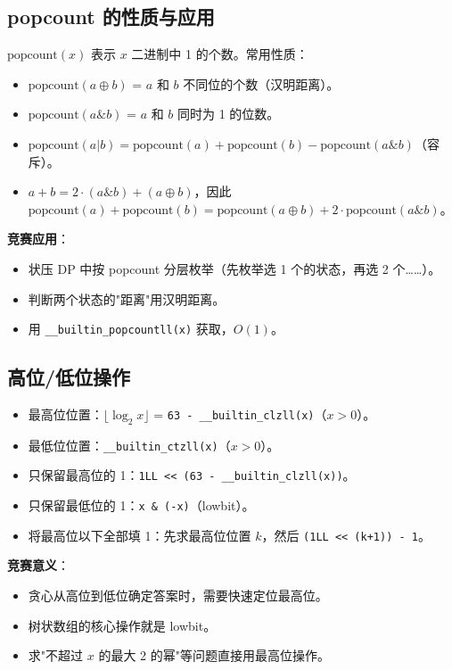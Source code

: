 \documentclass[UTF8,openany,oneside,zihao=-4]{ctexbook}
\begin{document}
\subsection{popcount 的性质与应用}

\begin{note}
$\text{popcount}(x)$ 表示 $x$ 二进制中 1 的个数。常用性质：
\begin{itemize}
  \item $\text{popcount}(a \oplus b)$ = $a$ 和 $b$ 不同位的个数（汉明距离）。
  \item $\text{popcount}(a \& b)$ = $a$ 和 $b$ 同时为 1 的位数。
  \item $\text{popcount}(a | b) = \text{popcount}(a) + \text{popcount}(b) - \text{popcount}(a \& b)$（容斥）。
  \item $a + b = 2 \cdot (a \& b) + (a \oplus b)$，因此 $\text{popcount}(a) + \text{popcount}(b) = \text{popcount}(a \oplus b) + 2 \cdot \text{popcount}(a \& b)$。
\end{itemize}

\textbf{竞赛应用}：
\begin{itemize}
  \item 状压 DP 中按 popcount 分层枚举（先枚举选 1 个的状态，再选 2 个……）。
  \item 判断两个状态的"距离"用汉明距离。
  \item 用 \lstinline|__builtin_popcountll(x)| 获取，$O(1)$。
\end{itemize}
\end{note}

\subsection{高位/低位操作}

\begin{note}
\begin{itemize}
  \item 最高位位置：$\lfloor \log_2 x \rfloor$ = \lstinline|63 - __builtin_clzll(x)|（$x > 0$）。
  \item 最低位位置：\lstinline|__builtin_ctzll(x)|（$x > 0$）。
  \item 只保留最高位的 1：\lstinline|1LL << (63 - __builtin_clzll(x))|。
  \item 只保留最低位的 1：\lstinline|x & (-x)|（lowbit）。
  \item 将最高位以下全部填 1：先求最高位位置 $k$，然后 \lstinline|(1LL << (k+1)) - 1|。
\end{itemize}

\textbf{竞赛意义}：
\begin{itemize}
  \item 贪心从高位到低位确定答案时，需要快速定位最高位。
  \item 树状数组的核心操作就是 lowbit。
  \item 求"不超过 $x$ 的最大 2 的幂"等问题直接用最高位操作。
\end{itemize}
\end{note}
\end{document}
